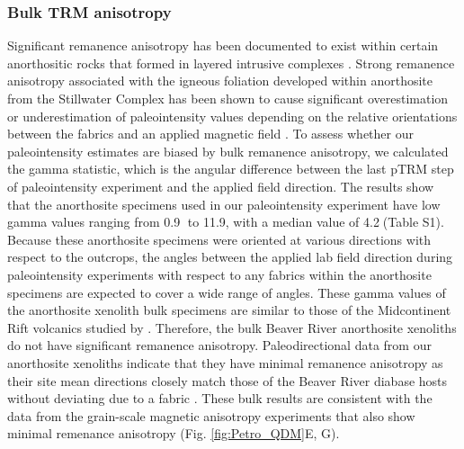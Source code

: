 \subsubsection*{Bulk TRM anisotropy}
Significant remanence anisotropy has been documented to exist within certain anorthositic rocks that formed in layered intrusive complexes \citep{Selkin2000a, Feinberg2006a}. Strong remanence anisotropy associated with the igneous foliation developed within anorthosite from the Stillwater Complex has been shown to cause significant overestimation or underestimation of paleointensity values depending on the relative orientations between the fabrics and an applied magnetic field \citep{Selkin2000a}. To assess whether our paleointensity estimates are biased by bulk remanence anisotropy, we calculated the gamma statistic, which is the angular difference between the last pTRM step of paleointensity experiment and the applied field direction. The results show that the anorthosite specimens used in our paleointensity experiment have low gamma values ranging from 0.9\textdegree$\;$ to 11.9\textdegree, with a median value of 4.2\textdegree$\;$(Table S1). Because these anorthosite specimens were oriented at various directions with respect to the outcrops, the angles between the applied lab field direction during paleointensity experiments with respect to any fabrics within the anorthosite specimens are expected to cover a wide range of angles. These gamma values of the anorthosite xenolith bulk specimens are similar to those of the Midcontinent Rift volcanics studied by \citealp{Sprain2018a}. Therefore, the bulk Beaver River anorthosite xenoliths do not have significant remanence anisotropy. Paleodirectional data from our anorthosite xenoliths indicate that they have minimal remanence anisotropy as their site mean directions closely match those of the Beaver River diabase hosts without deviating due to a fabric \citep{Zhang2021b}. These bulk results are consistent with the data from the grain-scale magnetic anisotropy experiments that also show minimal remenance anisotropy (Fig. \ref{fig:Petro_QDM}E, G). 

